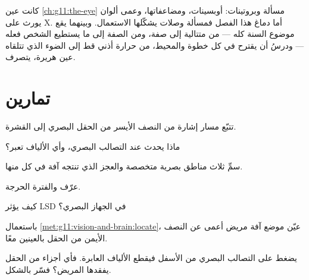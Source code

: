 \begin{remark}\label{rem:g11:vision-and-brain:year}
كانت عين \cref{ch:g11:the-eye} مسألة  وبروتينات: أوبسينات،
ومضاعفاتها، وعمى ألوان يورث على  X. أما دماغ هذا الفصل فمسألة
وصلات يشكّلها الاستعمال. وبينهما يقع موضوع السنة كله --- من متتالية
 إلى صفة، ومن الصفة إلى ما يستطيع الشخص فعله --- ودرسُ أن  يقترح في كل خطوة والمحيط، من حرارة أذني قط إلى الضوء الذي
تتلقاه عين هريرة، يتصرف.
\end{remark}

\section{تمارين}

\begin{exercise}[$\star$]\label{exo:g11:vision-and-brain:1}
تتبّع مسار إشارة من النصف الأيسر من الحقل البصري إلى القشرة.
\end{exercise}

\begin{exercise}[$\star$]\label{exo:g11:vision-and-brain:2}
ماذا يحدث عند التصالب البصري، وأي الألياف تعبر؟
\end{exercise}

\begin{exercise}[$\star$]\label{exo:g11:vision-and-brain:3}
سمِّ ثلاث مناطق بصرية متخصصة والعجز الذي تنتجه آفة في كل منها.
\end{exercise}

\begin{exercise}[$\star$]\label{exo:g11:vision-and-brain:4}
عرّف  والفترة الحرجة.
\end{exercise}

\begin{exercise}[$\star$]\label{exo:g11:vision-and-brain:5}
كيف يؤثر LSD في الجهاز البصري؟
\end{exercise}

\begin{exercise}[$\star\star$]\label{exo:g11:vision-and-brain:6}
باستعمال \cref{met:g11:vision-and-brain:locate}، عيّن موضع آفة مريض
أعمى عن النصف الأيمن من الحقل بالعينين معًا.
\end{exercise}

\begin{exercise}[$\star\star$]\label{exo:g11:vision-and-brain:7}
 يضغط على التصالب البصري من الأسفل فيقطع الألياف العابرة. فأي أجزاء
من الحقل يفقدها المريض؟ فسّر بالشكل.
\end{exercise}

